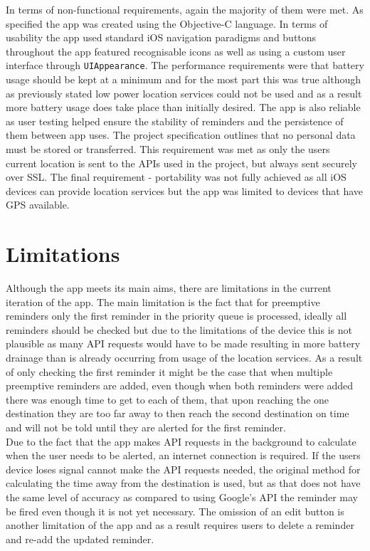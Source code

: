 \documentclass[12pt]{report}
\begin{document}
In terms of non-functional requirements, again the majority of them were met. As specified the app was created using the Objective-C language. In terms of usability the app used standard iOS navigation paradigms and buttons throughout the app featured recognisable icons as well as using a custom user interface through \texttt{UIAppearance}. The performance requirements were that battery usage should be kept at a minimum and for the most part this was true although as previously stated low power location services could not be used and as a result more battery usage does take place than initially desired. The app is also reliable as user testing helped ensure the stability of reminders and the persistence of them between app uses. The project specification outlines that no personal data must be stored or transferred. This requirement was met as only the users current location is sent to the APIs used in the project, but always sent securely over SSL. The final requirement - portability was not fully achieved as all iOS devices can provide location services but the app was limited to devices that have GPS available.

\section{Limitations}

Although the app meets its main aims, there are limitations in the current iteration of the app. The main limitation is the fact that for preemptive reminders only the first reminder in the priority queue is processed, ideally all reminders should be checked but due to the limitations of the device this is not plausible as many API requests would have to be made resulting in more battery drainage than is already occurring from usage of the location services. As a result of only checking the first reminder it might be the case that when multiple preemptive reminders are added, even though when both reminders were added there was enough time to get to each of them, that upon reaching the one destination they are too far away to then reach the second destination on time and will not be told until they are alerted for the first reminder.\\

Due to the fact that the app makes API requests in the background to calculate when the user needs to be alerted, an internet connection is required. If the users device loses signal cannot make the API requests needed, the original method for calculating the time away from the destination is used, but as that does not have the same level of accuracy as compared to using Google's API the reminder may be fired even though it is not yet necessary. The omission of an edit button is another limitation of the app and as a result requires users to delete a reminder and re-add the updated reminder.
\end{document}

